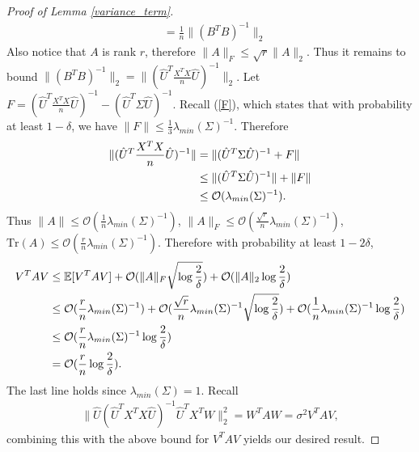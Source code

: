 \begin{proof}[Proof of Lemma \ref{variance_term}]
\begin{align}
&= \frac{1}{n} \|(B^{T}B)^{-1}\|_{2}
\end{align}
Also notice that $A$ is rank $r$, therefore $\|A\|_{F} \leq \sqrt{r} \|A\|_{2}$. Thus it remains to bound $\|(B^{T}B)^{-1}\|_{2} = \|(\hat{U}^{T}\frac{X^{T}X}{n}\hat{U} )^{-1}\|_{2}$. Let $F =(\hat{U}^{T}\frac{X^{T}X}{n}\hat{U})^{-1} -(\hat{U}^{T}\Sigma\hat{U})^{-1}$. Recall (\ref{F}), which states that with probability at least $1-\delta$, we have 
$\|F\|\leq \frac{1}{3}\lambda_{min}(\Sigma)^{-1}$. Therefore 
\begin{align}
\|(\hat{U}^{T}\frac{X^{T}X}{n}\hat{U} )^{-1}\|  &= \|(\hat{U}^{T}\Sigma \hat{U})^{-1}+F\|  \notag \\
&\leq \|(\hat{U}^{T}\Sigma \hat{U})^{-1}\|+\|F\|  \notag \\
&\leq \mathcal{O}(\lambda_{min}(\Sigma)^{-1}). 
\end{align}
Thus $\|A\| \leq \mathcal{O}(\frac{1}{n}\lambda_{min}(\Sigma)^{-1})$, $\|A\|_{F} \leq \mathcal{O}(\frac{\sqrt{r}}{n}\lambda_{min}(\Sigma)^{-1})$, 
$\text{Tr}(A) \leq \mathcal{O}(\frac{r}{n}\lambda_{min}(\Sigma)^{-1})$. Therefore with probability at least $1-2\delta$,
\begin{align}
V^{T}AV &\leq \mathbb{E}[V^{T}AV] + \mathcal{O}(\|A\|_{F}\sqrt{\log\frac{2}{\delta}})  + \mathcal{O}(\|A\|_{2}\log\frac{2}{\delta})  \notag \\
& \leq \mathcal{O}(\frac{r}{n}\lambda_{min}(\Sigma)^{-1}) + \mathcal{O}(\frac{\sqrt{r}}{n}\lambda_{min}(\Sigma)^{-1}\sqrt{\log \frac{2}{\delta}}) + \mathcal{O}(\frac{1}{n}\lambda_{min}(\Sigma)^{-1}\log \frac{2}{\delta}) \notag \\
& \leq \mathcal{O}(\frac{r}{n}\lambda_{min}(\Sigma)^{-1}\log \frac{2}{\delta}) \notag \\
&= \mathcal{O}(\frac{r}{n}\log \frac{2}{\delta}).
\end{align}
The last line holds since $\lambda_{min}(\Sigma)=1$.
Recall 
\begin{align}
\|\hat{U}(\hat{U}^{T}X^{T}X\hat{U})^{-1}\hat{U}^{T}X^{T} W\|_{2}^{2} = W^{T}AW =\sigma^{2} V^{T}AV,
\end{align}
combining this with the above bound for $V^{T}AV$ yields our desired result.
\end{proof}


